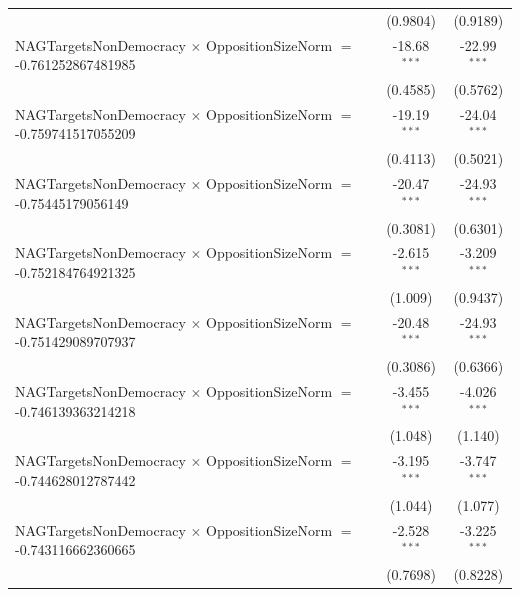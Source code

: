 \begin{tabular}{lcc}
                                                                                & (0.9804)             & (0.9189)\\   
   NAGTargetsNonDemocracy $\times$ OppositionSizeNorm $=$ -0.761252867481985    & -18.68$^{***}$       & -22.99$^{***}$\\   
                                                                                & (0.4585)             & (0.5762)\\   
   NAGTargetsNonDemocracy $\times$ OppositionSizeNorm $=$ -0.759741517055209    & -19.19$^{***}$       & -24.04$^{***}$\\   
                                                                                & (0.4113)             & (0.5021)\\   
   NAGTargetsNonDemocracy $\times$ OppositionSizeNorm $=$ -0.75445179056149     & -20.47$^{***}$       & -24.93$^{***}$\\   
                                                                                & (0.3081)             & (0.6301)\\   
   NAGTargetsNonDemocracy $\times$ OppositionSizeNorm $=$ -0.752184764921325    & -2.615$^{***}$       & -3.209$^{***}$\\   
                                                                                & (1.009)              & (0.9437)\\   
   NAGTargetsNonDemocracy $\times$ OppositionSizeNorm $=$ -0.751429089707937    & -20.48$^{***}$       & -24.93$^{***}$\\   
                                                                                & (0.3086)             & (0.6366)\\   
   NAGTargetsNonDemocracy $\times$ OppositionSizeNorm $=$ -0.746139363214218    & -3.455$^{***}$       & -4.026$^{***}$\\   
                                                                                & (1.048)              & (1.140)\\   
   NAGTargetsNonDemocracy $\times$ OppositionSizeNorm $=$ -0.744628012787442    & -3.195$^{***}$       & -3.747$^{***}$\\   
                                                                                & (1.044)              & (1.077)\\   
   NAGTargetsNonDemocracy $\times$ OppositionSizeNorm $=$ -0.743116662360665    & -2.528$^{***}$       & -3.225$^{***}$\\   
                                                                                & (0.7698)             & (0.8228)\\   

\end{tabular}
